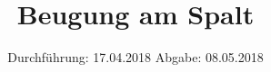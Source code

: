 

\subject{Versuch 406}
\title{Beugung am Spalt}
\date{%
  Durchführung: 17.04.2018
  \hspace{3em}
  Abgabe: 08.05.2018
}



\maketitle
\thispagestyle{empty}
\tableofcontents
\newpage






\printbibliography{}


